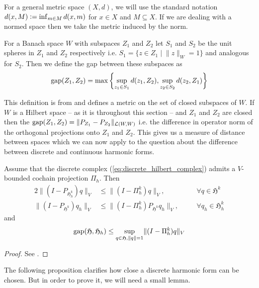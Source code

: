 \documentclass[../master_thesis.tex]{subfiles}
\begin{document}
For a general metric space $(X,d)$, we will use the standard notation 
$d(x,M) \vcentcolon= \inf_{m\in M} d(x,m)$ for $x\in X$ 
and $M \subseteq X$. If we are dealing with a normed space then we 
take the metric induced by the norm.

\begin{definition}
    For a Banach space $W$ with subspaces $Z_1$ and $Z_2$
    let $S_1$ and $S_2$ be the unit spheres in $Z_1$ and $Z_2$ respectively i.e.
    $S_1 = \{ z\in Z_1 \mid \lVert z \rVert _W = 1 \}$ and analogous for $S_2$.
    Then we define 
    the gap between these subspaces as 
    \begin{align*}
        \operatorname{gap}(Z_1, Z_2) = \max\left \{ \sup_{z_1 \in S_1} d(z_1, Z_2), \sup_{z_2 \in S_2} d(z_2, Z_1) \right \}
    \end{align*}
\end{definition}
This definition is from \cite[Ch.4 §2.1]{kato_perturbation_theory} and defines a metric on the set of closed subspaces
of $W$.
If $W$ is a Hilbert space -- as it is throughout this section -- and $Z_1$ and $Z_2$ are closed then
the $\operatorname{gap}(Z_1, Z_2) = \lVert P_{Z_1} - P_{Z_2} \rVert _{\mathcal{L}(W,W)}$ i.e. the difference in operator norm of the 
orthogonal projections onto $Z_1$ and $Z_2$. This gives us a measure of distance between 
spaces which we can now apply to the question about the difference between 
discrete and continuous harmonic forms.

\begin{proposition}
    Assume that the discrete complex (\ref{eq:discrete_hilbert_complex}) admits a $V$-bounded cochain projection
    $\Pi_h$. Then
    \begin{alignat}{2}
        \lVert (I - P_{\mathfrak{H}^k_h}) q \rVert _V &\leq \lVert (I - \Pi_h^k) q \rVert _V, 
            &&\forall q \in \mathfrak{H}^k \label{eq:difference_identity_projection_discrete_harmonics}
        \\ \lVert (I - P_{\mathfrak{H}^k}) q_h \rVert _V 
        &\leq \lVert (I - \Pi_h^k)P_{\mathfrak{H}^k} q_h \rVert _V, \quad 
                &&\forall q_h \in \mathfrak{H}^k_h 
    \end{alignat}
    and 
    \begin{align*}
        \operatorname{gap} (\mathfrak{H}, \mathfrak{H}_h) 
        \leq \sup_{q \in \mathfrak{H}, \lVert q \rVert = 1} \lVert (I - \Pi_h^k) q \rVert _V
    \end{align*}
\end{proposition}
\begin{proof}
    See \cite[Thm.\,5.2]{arnold}. 
\end{proof}
The following proposition 
clarifies how close a discrete harmonic form can be chosen. But in order to prove it, 
we will need a small lemma.
\end{document}
